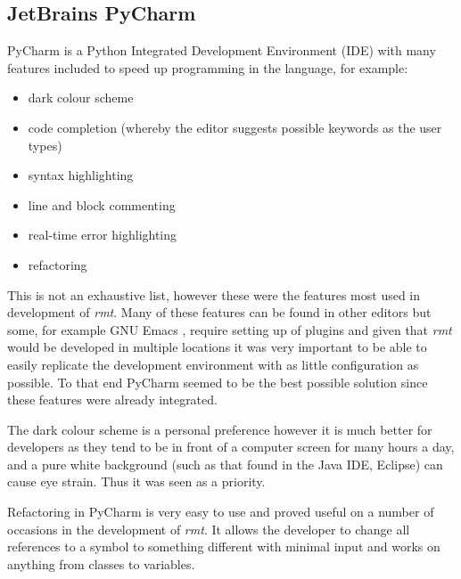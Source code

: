\subsection{JetBrains PyCharm}
PyCharm \citep{pycharm} is a Python Integrated Development Environment (IDE) with many features included to speed up programming in the language, for example:
\begin{itemize}
	\item dark colour scheme
	\item code completion (whereby the editor suggests possible keywords as the user types)
	\item syntax highlighting
	\item line and block commenting
	\item real-time error highlighting
	\item refactoring
\end{itemize}
This is not an exhaustive list, however these were the features most used in development of \emph{rmt}.
Many of these features can be found in other editors but some, for example GNU Emacs \citeyearpar{emacs}, require setting up of plugins and given that \emph{rmt} would be developed in multiple locations it was very important to be able to easily replicate the development environment with as little configuration as possible.
To that end PyCharm seemed to be the best possible solution since these features were already integrated.

The dark colour scheme is a personal preference however it is much better for developers as they tend to be in front of a computer screen for many hours a day, and a pure white background (such as that found in the Java IDE, Eclipse) can cause eye strain.
Thus it was seen as a priority.

Refactoring in PyCharm is very easy to use and proved useful on a number of occasions in the development of \emph{rmt}.
It allows the developer to change all references to a symbol to something different with minimal input and works on anything from classes to variables.